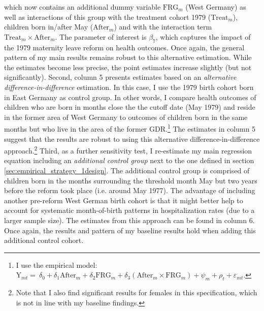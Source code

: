 \documentclass[11pt, a4paper]{article} %
\begin{document}
which now contains an additional dummy variable $\text{FRG}_m$ (West Germany) as well as interactions of this group with the treatment cohort 1979 ($\text{Treat}_{m}$), children born in/after May ($\text{After}_{m}$) and with the interaction term $\text{Treat}_{m} \times \text{After}_{m}$. The parameter of interest is $\beta_7$, which captures the impact of the 1979 maternity leave reform on health outcomes. Once again, the general pattern of my main results remains robust to this alternative estimation. While the estimates become less precise, the point estimates increase slightly (but not significantly). Second, column 5 presents estimates based on an \textit{alternative difference-in-difference} estimation. In this case, I use the 1979 birth cohort born in East Germany as control group. In other words, I compare health outcomes of children who are born in months close the the cutoff date (May 1979) and reside in the former area of West Germany to outcomes of children born in the same months but who live in the area of the former GDR.\footnote{I use the empirical model: $\text{Y}_{mt} =\ \delta_0 + \delta_1 \text{After}_{m} + \delta_2 \text{FRG}_m + \delta_3 (\text{After}_m \times \text{FRG}_m) + \psi_m + \rho_t + \varepsilon_{mt}$.} The estimates in column 5 suggest that the results are robust to using this alternative difference-in-difference approach.\footnote{Note that I also find significant results for females in this specification, which is not in line with my baseline findings.} Third, as a further sensitivity test, I re-estimate my main regression equation including an \textit{additional control group} next to the one defined in section \ref{sec:empirical_strategy_1design}. The additional control group is comprised of children born in the months surrounding the threshold month May but two years before the reform took place (i.e. around May 1977). The advantage of including another pre-reform West German birth cohort is that it might better help to account for systematic month-of-birth patterns in hospitalization rates (due to a larger sample size). The estimates from this approach can be found in column 6. Once again, the results and pattern of my baseline results hold when adding this additional control cohort.\newline
\end{document}
